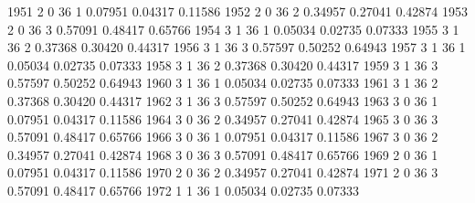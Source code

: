 \documentclass{article}
\begin{document}
\begin{Woutput}
1951      2       0      36       1       0.07951    0.04317    0.11586
1952      2       0      36       2       0.34957    0.27041    0.42874
1953      2       0      36       3       0.57091    0.48417    0.65766
1954      3       1      36       1       0.05034    0.02735    0.07333
1955      3       1      36       2       0.37368    0.30420    0.44317
1956      3       1      36       3       0.57597    0.50252    0.64943
1957      3       1      36       1       0.05034    0.02735    0.07333
1958      3       1      36       2       0.37368    0.30420    0.44317
1959      3       1      36       3       0.57597    0.50252    0.64943
1960      3       1      36       1       0.05034    0.02735    0.07333
1961      3       1      36       2       0.37368    0.30420    0.44317
1962      3       1      36       3       0.57597    0.50252    0.64943
1963      3       0      36       1       0.07951    0.04317    0.11586
1964      3       0      36       2       0.34957    0.27041    0.42874
1965      3       0      36       3       0.57091    0.48417    0.65766
1966      3       0      36       1       0.07951    0.04317    0.11586
1967      3       0      36       2       0.34957    0.27041    0.42874
1968      3       0      36       3       0.57091    0.48417    0.65766
1969      2       0      36       1       0.07951    0.04317    0.11586
1970      2       0      36       2       0.34957    0.27041    0.42874
1971      2       0      36       3       0.57091    0.48417    0.65766
1972      1       1      36       1       0.05034    0.02735    0.07333


\end{Woutput}
\end{document}
